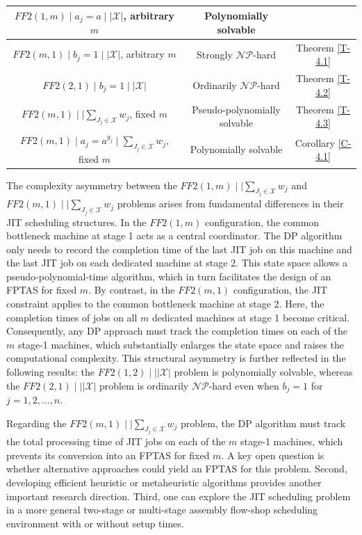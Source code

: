 \documentclass[12pt, eqno, limlimits]{article}
\begin{document}
\begin{sloppypar}
\begin{table}[htpb]
\begin{center}
\begin{tabular}{|c|c|c|}
                        $FF2(1, m)\mid a_j=a \mid |\mathcal{X}|$, arbitrary $m$ & Polynomially solvable & \cite{HeegerHISShabtay2026} \\ \hline
                        $FF2(m, 1)\mid b_j=1 \mid |\mathcal{X}|$, arbitrary $m$ & Strongly $\mathcal{NP}$-hard	& Theorem \ref{T-4.1} \\ \hline
                        $FF2(2, 1)\mid b_j=1 \mid |\mathcal{X}|$ & Ordinarily $\mathcal{NP}$-hard	& Theorem \ref{T-4.2} \\ \hline
                        $FF2(m, 1)\mid  \mid \sum_{J_j \in \mathcal{X}} w_j$, fixed $m$ & Pseudo-polynomially solvable & Theorem \ref{T-4.3} \\ \hline
                        $FF2(m, 1)\mid a_j=a^{g_j} \mid \sum_{J_j \in \mathcal{X}} w_j$, fixed $m$	& Polynomially solvable & Corollary \ref{C-4.1} \\ \hline
                    \end{tabular}
                \end{center} 
        \end{table}
        
        The complexity asymmetry between the $FF2(1, m)\mid \mid \sum_{J_j \in \mathcal{X}} w_j$ and $FF2(m, 1)\mid \mid \sum_{J_j \in \mathcal{X}} w_j$ problems arises from fundamental differences in their JIT scheduling structures. In the $FF2(1, m)$ configuration, the common bottleneck machine at stage 1 acts as a central coordinator. The DP algorithm only needs to record the completion time of the last JIT job on this machine and the last JIT job on each dedicated machine at stage 2. This state space allows a pseudo-polynomial-time algorithm, which in turn facilitates the design of an FPTAS for fixed $m$. By contrast, in the $FF2(m, 1)$ configuration, the JIT constraint applies to the common bottleneck machine at stage 2. Here, the completion times of jobs on all $m$ dedicated machines at stage 1 become critical. Consequently, any DP approach must track the completion times on each of the $m$ stage-1 machines, which substantially enlarges the state space and raises the computational complexity. This structural asymmetry is further reflected in the following results: the $FF2(1, 2)\mid  \mid |\mathcal{X}|$ problem is polynomially solvable, whereas the $FF2(2, 1) \mid  \mid |\mathcal{X}|$ problem is ordinarily $\mathcal{NP}$-hard even when $b_j=1$ for $j=1, 2, \ldots, n$.
        
        Regarding the $FF2(m, 1)\mid \mid \sum_{J_j \in \mathcal{X}} w_j$ problem, the DP algorithm must track the total processing time of JIT jobs on each of the $m$ stage-1 machines, which prevents its conversion into an FPTAS for fixed $m$. A key open question is whether alternative approaches could yield an FPTAS for this problem. Second, developing efficient heuristic or metaheuristic algorithms provides another important research direction. Third, one can explore the JIT scheduling problem in a more general two-stage or multi-stage assembly flow-shop scheduling environment with or without setup times.  \\
        

\end{sloppypar}
\end{document}
